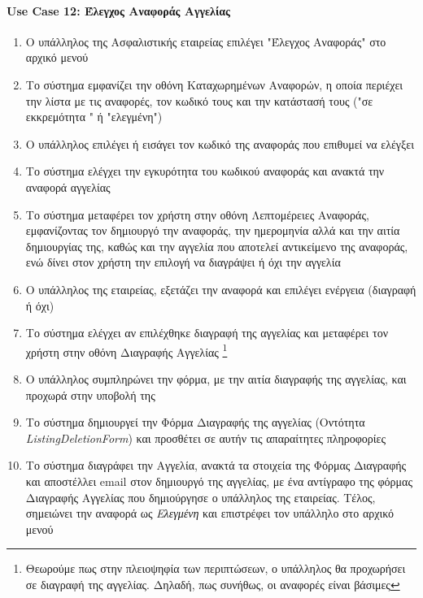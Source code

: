 \documentclass{../ol-softwaremanual}
\begin{document}
	\newpage
	\centering
	
	\paragraph{\en Use Case 12: \gr Έλεγχος Αναφοράς Αγγελίας} 

	\begin{enumerate}
		\item Ο υπάλληλος της Ασφαλιστικής εταιρείας επιλέγει \en"\gr Έλεγχος Αναφοράς\en" \gr στο αρχικό μενού
		\item Το σύστημα εμφανίζει την οθόνη Καταχωρημένων Αναφορών, η οποία περιέχει την λίστα με τις αναφορές, τον κωδικό τους και την κατάστασή τους (\en"\gr σε εκκρεμότητα \en" \gr ή \en"\gr ελεγμένη\en"\gr)
		\item Ο υπάλληλος επιλέγει ή εισάγει τον κωδικό της αναφοράς που επιθυμεί να ελέγξει 
		\item Το σύστημα ελέγχει την εγκυρότητα του κωδικού αναφοράς και ανακτά την αναφορά αγγελίας
		\item Το σύστημα μεταφέρει τον χρήστη στην οθόνη Λεπτομέρειες Αναφοράς, εμφανίζοντας τον δημιουργό την αναφοράς, την ημερομηνία αλλά και την αιτία δημιουργίας της, καθώς και την αγγελία που αποτελεί αντικείμενο της αναφοράς, ενώ δίνει στον χρήστη την επιλογή να διαγράψει ή όχι την αγγελία
		\item Ο υπάλληλος της εταιρείας, εξετάζει την αναφορά και επιλέγει ενέργεια (διαγραφή ή όχι)
		\item Το σύστημα ελέγχει αν επιλέχθηκε διαγραφή της αγγελίας και μεταφέρει τον χρήστη στην οθόνη Διαγραφής Αγγελίας \footnote[2]{Θεωρούμε πως στην πλειοψηφία των περιπτώσεων, ο υπάλληλος θα προχωρήσει σε διαγραφή της αγγελίας. Δηλαδή, πως συνήθως, οι αναφορές είναι βάσιμες}
		\item Ο υπάλληλος συμπληρώνει την φόρμα, με την αιτία διαγραφής της αγγελίας, και προχωρά στην υποβολή της
		\item Το σύστημα δημιουργεί την Φόρμα Διαγραφής της αγγελίας (Οντότητα \en \textit{ListingDeletionForm}\gr) και προσθέτει σε αυτήν τις απαραίτητες πληροφορίες
		\item Το σύστημα διαγράφει την Αγγελία, ανακτά τα στοιχεία της Φόρμας Διαγραφής και αποστέλλει \en email \gr στον δημιουργό της αγγελίας, με ένα αντίγραφο της φόρμας Διαγραφής Αγγελίας που δημιούργησε ο υπάλληλος της εταιρείας. Τέλος, σημειώνει την αναφορά ως \textit{Ελεγμένη} και επιστρέφει τον υπάλληλο στο αρχικό μενού
	\end{enumerate}
	
\end{document}
